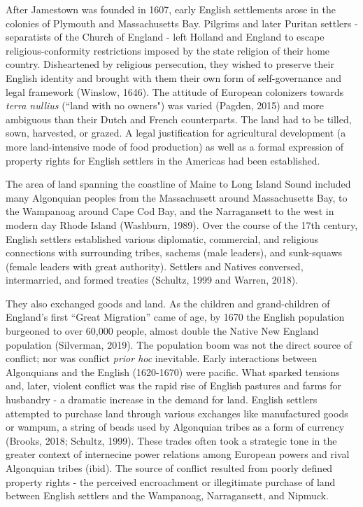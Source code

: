 \documentclass[11pt, oneside]{article}
\begin{document}

After Jamestown was founded in 1607, early English settlements arose in the colonies of Plymouth and Massachusetts Bay. Pilgrims and later Puritan settlers - separatists of the Church of England - left Holland and England to escape religious-conformity restrictions imposed by the state religion of their home country. Disheartened by religious persecution, they wished to preserve their English identity and brought with them their own form of self-governance and legal framework (Winslow, 1646). The attitude of European colonizers towards {\em terra nullius} (``land with no owners") was varied (Pagden, 2015) and more ambiguous than their Dutch and French counterparts. 
The land had to be tilled, sown, harvested, or grazed. A legal justification for agricultural development (a more land-intensive mode of food production) as well as a formal expression of property rights for English settlers in the Americas had been established.

The area of land spanning the coastline of Maine to Long Island Sound included many Algonquian peoples from the Massachusett around Massachusetts Bay, to the Wampanoag around Cape Cod Bay, and the Narragansett to the west in modern day Rhode Island (Washburn, 1989). Over the course of the 17th century, English settlers established various diplomatic, commercial, and religious connections with surrounding tribes, sachems (male leaders), and sunk-squaws (female leaders with great authority). Settlers and Natives conversed, intermarried, and formed treaties (Schultz, 1999 and Warren, 2018). 

They also exchanged goods and land. As the children and grand-children of England's first ``Great Migration'' came of age, by 1670 the English population burgeoned to over 60,000 people, almost double the Native New England population (Silverman, 2019). The population boom was not the direct source of conflict; nor was conflict {\em prior hoc} inevitable. Early interactions between Algonquians and the English (1620-1670) were pacific. What sparked tensions and, later, violent conflict was the rapid rise of English pastures and farms for husbandry - a dramatic increase in the demand for land. English settlers attempted to purchase land through various exchanges like manufactured goods or wampum, a string of beads used by Algonquian tribes as a form of currency (Brooks, 2018; Schultz, 1999). These trades often took a strategic tone in the greater context of internecine power relations among European powers and rival Algonquian tribes (ibid). The source of conflict resulted from poorly defined property rights - the perceived encroachment or illegitimate purchase of land between English settlers and the Wampanoag, Narragansett, and Nipmuck.
\end{document}
